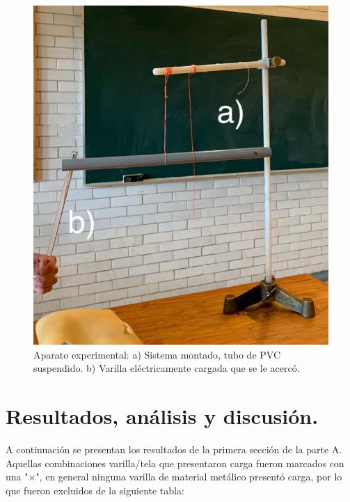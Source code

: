 \documentclass[letterpaper, 11 pt]{article}
\begin{document}
\begin{multicols*}{2}

\begin{figure}[H]
    \includegraphics[scale=0.23]{pitotote.jpeg}
    \centering
    \caption{Aparato experimental: a) Sistema montado, tubo de PVC suspendido. b) Varilla eléctricamente cargada que se le acercó.}
\end{figure}

\section{Resultados, análisis y discusión.}
A continuación se presentan los resultados de la primera sección de la parte A. Aquellas combinaciones varilla/tela que presentaron carga fueron marcados con una "$\times$", en general ninguna varilla de material metálico presentó carga, por lo que fueron excluidos de la siguiente tabla:


\end{multicols*}
\end{document}

